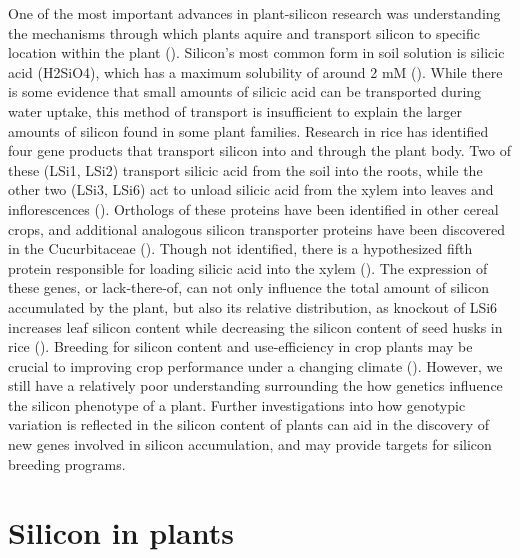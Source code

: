\documentclass[12pt, letterpaper, ]{report}
\begin{document}
One of the most important advances in plant-silicon research was understanding the mechanisms through which plants aquire and transport silicon to specific location within the plant (\cite{coskun_controversies_2019}). Silicon’s most common form in soil solution is silicic acid (H2SiO4), which has a maximum solubility of around 2 mM (\cite{haynes_contemporary_2014}). While there is some evidence that small amounts of silicic acid can be transported during water uptake, this method of transport is insufficient to explain the larger amounts of silicon found in some plant families. Research in rice has identified four gene products that transport silicon into and through the plant body. Two of these (LSi1, LSi2) transport silicic acid from the soil into the roots, while the other two (LSi3, LSi6) act to unload silicic acid from the xylem into leaves and inflorescences (\cite{yamaji_orchestration_2015}). Orthologs of these proteins have been identified in other cereal crops, and additional analogous silicon transporter proteins have been discovered in the Cucurbitaceae (\cite{reynolds_silicon_2016}). Though not identified, there is a hypothesized fifth protein responsible for loading silicic acid into the xylem (\cite{farooq_silicon_2015}). The expression of these genes, or lack-there-of, can not only influence the total amount of silicon accumulated by the plant, but also its relative distribution, as knockout of LSi6 increases leaf silicon content while decreasing the silicon content of seed husks in rice (\cite{yamaji_transporter_2008}). Breeding for silicon content and use-efficiency in crop plants may be crucial to improving crop performance under a changing climate (\cite{christian_breeding_2022}). However, we still have a relatively poor understanding surrounding the how genetics influence the silicon phenotype of a plant. Further investigations into how genotypic variation is reflected in the silicon content of plants can aid in the discovery of new genes involved in silicon accumulation, and may provide targets for silicon breeding programs. 

\section{Silicon in plants}	
\end{document}
